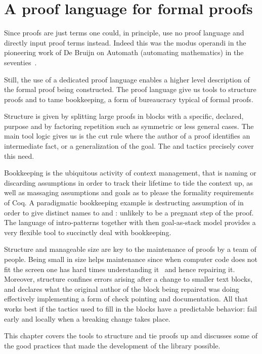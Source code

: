 \chapter{A proof language for formal proofs}{}
\label{ch:script}


Since proofs are just terms one could, in principle, use no proof
language and directly input proof terms instead.  Indeed this was the
modus operandi in the pioneering work of De Bruijn on Automath
(automating mathematics) in the seventies~\cite{nederpelt-94}.

Still, the use of a dedicated proof language enables a higher level
description of the formal proof being constructed.  
The \mcbSSR{} proof language give us tools to structure proofs and
to tame bookkeeping, a form of bureaucracy typical of formal proofs.

Structure is given by splitting large proofs in blocks with a
specific, declared, purpose and by factoring repetition such as
symmetric or less general cases. The main tool logic gives us is the
cut rule where the author of a proof identifies an intermediate fact,
or a generalization of the goal. The  and  tactics
precisely cover this need.

Bookkeeping is the ubiquitous activity of context management, that is
naming or discarding assumptions in order to track their lifetime to tide
the context up, as well as massaging assumptions and goals as to
please the formality requirements of Coq.  A paradigmatic bookkeeping
example is destructing assumption of  in order to give
distinct names to  and : unlikely to be a pregnant step of
the proof.  The language of intro-patterns together with then
goal-as-stack model provides a very flexible tool to
succinctly deal with bookkeeping.

Structure and manageable size are key to the maintenance of proofs by
a team of people.  Being small in size helps maintenance since when
computer code does not fit the screen one has hard times understanding
it~\cite{Weinberg:1985:PCP:536771} and hence repairing it.  Moreover,
structure confines errors arising after a change to smaller text
blocks, and declares what the original author of the block being
repaired was doing effectively implementing a form of check pointing
and documentation.  All that works best if the tactics used to fill in
the blocks have a predictable behavior: fail early and locally when a
breaking change takes place.

This chapter covers the tools to structure and tie proofs up and discusses
some of the good practices that made the development of the \mcbMC{}
library possible.


